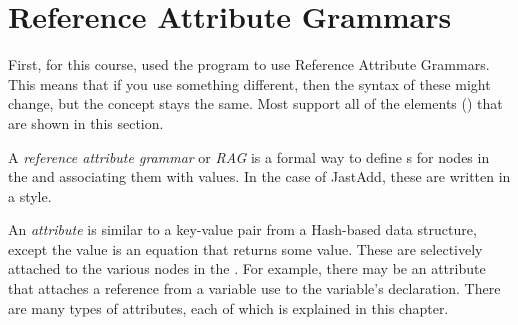\section{Reference Attribute Grammars}\label{sec:Reference_Attribute_Grammars}
First, for this course, \theauthor{} used the \JastAdd{} program to use Reference Attribute Grammars.
This means that if you use something different, then the syntax of these might change, but the concept stays the same.
Most  support all of the elements () that are shown in this section.

\begin{definition}\label{def:Reference_Attribute_Grammar}
  A \emph{reference attribute grammar} or \emph{RAG} is a formal way to define s for nodes in the  and associating them with values.
  In the case of JastAdd, these are written in a  style.
\end{definition}

\begin{definition}[Attribute]\label{def:Attribute}
  An \emph{attribute} is similar to a key-value pair from a Hash-based data structure, except the value is an equation that returns some value.
  These are selectively attached to the various nodes in the .
  For example, there may be an attribute that attaches a reference from a variable use to the variable's declaration.
  There are many types of attributes, each of which is explained in this chapter.
\end{definition}

